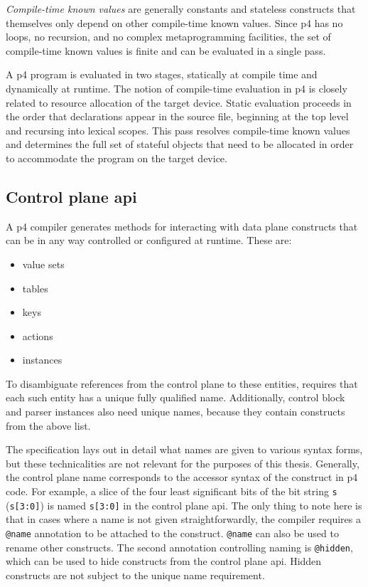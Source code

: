 \emph{Compile-time known values} are generally constants and stateless
constructs that themselves only depend on other compile-time known values. Since
\acrshort{p4} has no loops, no recursion, and no complex metaprogramming
facilities, the set of compile-time known values is finite and can be evaluated
in a single pass.

A \acrshort{p4} program is evaluated in two stages, statically at compile time
and dynamically at runtime. The notion of compile-time evaluation in
\acrshort{p4} is closely related to resource allocation of the target device.
Static evaluation proceeds in the order that declarations appear in the source
file, beginning at the top level and recursing into lexical scopes. This pass
resolves compile-time known values and determines the full set of stateful
objects that need to be allocated in order to accommodate the program on the
target device.

\subsection*{Control plane \acrshort{api}}

A \acrshort{p4} compiler generates methods for interacting with data plane
constructs that can be in any way controlled or configured at runtime. These are:

\begin{itemize}
	\item value sets
	\item tables
	\item keys
	\item actions
	\item \extern{} instances
\end{itemize}

To disambiguate references from the control plane to these entities, \pfs
requires that each such entity has a unique fully qualified name. Additionally,
control block and parser instances also need unique names, because they contain
constructs from the above list.

The \pfs specification lays out in detail what names are given to various syntax
forms, but these technicalities are not relevant for the purposes of this
thesis. Generally, the control plane name corresponds to the accessor syntax of
the construct in \acrshort{p4} code. For example, a slice of the four least
significant bits of the bit string \texttt{s} (\texttt{s[3:0]}) is named
\texttt{s[3:0]} in the control plane \acrshort{api}. The only thing to note here
is that in cases where a name is not given straightforwardly, the compiler
requires a \texttt{@name} annotation to be attached to the construct.
\texttt{@name} can also be used to rename other constructs. The second
annotation controlling naming is \texttt{@hidden}, which can be used to hide
constructs from the control plane \acrshort{api}. Hidden constructs are not
subject to the unique name requirement.

